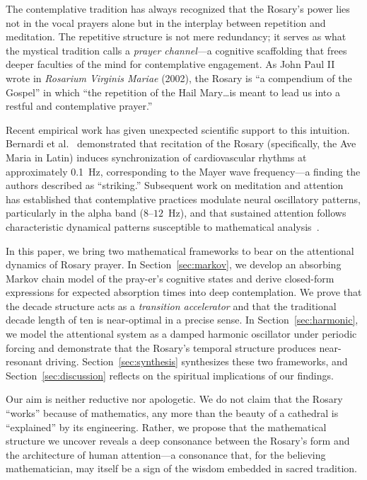 \documentclass[journal]{IEEEtran}
\theoremstyle{definition}
\theoremstyle{remark}
\begin{document}
The contemplative tradition has always recognized that the Rosary's power lies not in the vocal prayers alone but in the interplay between repetition and meditation. The repetitive structure is not mere redundancy; it serves as what the mystical tradition calls a \emph{prayer channel}---a cognitive scaffolding that frees deeper faculties of the mind for contemplative engagement. As John Paul II wrote in \emph{Rosarium Virginis Mariae} (2002), the Rosary is ``a compendium of the Gospel'' in which ``the repetition of the Hail Mary\ldots is meant to lead us into a restful and contemplative prayer.''

Recent empirical work has given unexpected scientific support to this intuition. Bernardi et al.~\cite{bernardi2001} demonstrated that recitation of the Rosary (specifically, the Ave Maria in Latin) induces synchronization of cardiovascular rhythms at approximately 0.1~Hz, corresponding to the Mayer wave frequency---a finding the authors described as ``striking.'' Subsequent work on meditation and attention~\cite{lutz2008,cahn2006} has established that contemplative practices modulate neural oscillatory patterns, particularly in the alpha band ($8$--$12$~Hz), and that sustained attention follows characteristic dynamical patterns susceptible to mathematical analysis~\cite{smallwood2006,braboszcz2011}.

In this paper, we bring two mathematical frameworks to bear on the attentional dynamics of Rosary prayer. In Section~\ref{sec:markov}, we develop an absorbing Markov chain model of the pray-er's cognitive states and derive closed-form expressions for expected absorption times into deep contemplation. We prove that the decade structure acts as a \emph{transition accelerator} and that the traditional decade length of ten is near-optimal in a precise sense. In Section~\ref{sec:harmonic}, we model the attentional system as a damped harmonic oscillator under periodic forcing and demonstrate that the Rosary's temporal structure produces near-resonant driving. Section~\ref{sec:synthesis} synthesizes these two frameworks, and Section~\ref{sec:discussion} reflects on the spiritual implications of our findings.

Our aim is neither reductive nor apologetic. We do not claim that the Rosary ``works'' because of mathematics, any more than the beauty of a cathedral is ``explained'' by its engineering. Rather, we propose that the mathematical structure we uncover reveals a deep consonance between the Rosary's form and the architecture of human attention---a consonance that, for the believing mathematician, may itself be a sign of the wisdom embedded in sacred tradition.
\end{document}
